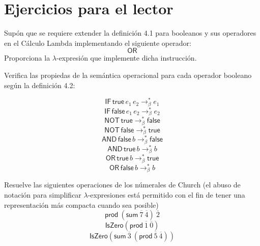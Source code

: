             \section{Ejercicios para el lector}

                \begin{exercise}
                    Supón que se requiere extender la definición 4.1 para booleanos y sus operadores en el Cálculo Lambda implementando el siguiente operador:
                    \[\textsf{OR}\]
		Proporciona la $\lambda$-expresión que implemente dicha instrucción.
                \end{exercise}

		\bigskip


                \begin{exercise}
                    Verifica las propiedas de la semántica operacional para cada operador booleano según la definición 4.2:

                        $$\mathsf{IF}\,\textsf{true}\,e_1\,e_2 \to_\beta^* e_1$$ 
                        $$\mathsf{IF}\,\textsf{false}\,e_1\,e_2 \to_\beta^* e_2$$ 
                        $$\mathsf{NOT}\,\textsf{true}\to_\beta^* \textsf{false}$$
                        $$\mathsf{NOT}\,\textsf{false}\to_\beta^* \textsf{true}$$
                        $$\mathsf{AND}\,\textsf{false}\,b\to_\beta^* \textsf{false}$$
                        $$\mathsf{AND}\,\textsf{true}\,b\to_\beta^* b$$
                        $$\mathsf{OR}\,\textsf{true}\,b\to_\beta^* \textsf{true}$$
                        $$\mathsf{OR}\,\textsf{false}\,b\to_\beta^* b$$
                        
                \end{exercise}


                \begin{exercise}
                    Resuelve las siguientes operaciones de los númerales de Church (el abuso de notación para simplificar $\lambda$-expresiones está permitido con el fin de tener una representación más compacta cuando sea posible)
                    \[
                            \textsf{prod}\ (\textsf{sum}\ \overline{7}\ \overline{4})\ \overline{2}
                    \]
                    \[
                            \textsf{IsZero} (\textsf{prod}\ \overline{1}\ \overline{0})
                    \]
                    \[
                            \textsf{IsZero}( \textsf{sum}\ \overline{3}\ (\textsf{prod}\ \overline{5}\ \overline{4}))
                    \]
                \end{exercise}  


